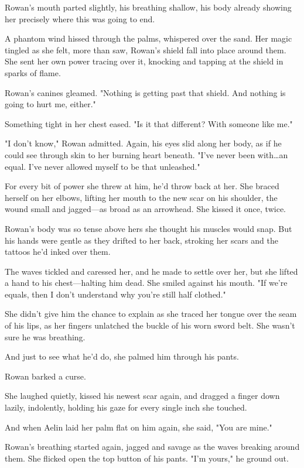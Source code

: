 Rowan's mouth parted slightly, his breathing shallow, his body already showing her precisely where this was going to end.

A phantom wind hissed through the palms, whispered over the sand.
Her magic tingled as she felt, more than saw, Rowan's shield fall into place around them.
She sent her own power tracing over it, knocking and tapping at the shield in sparks of flame.

Rowan's canines gleamed.
"Nothing is getting past that shield.
And nothing is going to hurt me, either."

Something tight in her chest eased.
"Is it that different?
With someone like me."

"I don't know," Rowan admitted.
Again, his eyes slid along her body, as if he could see through skin to her burning heart beneath.
"I've never been with\ldots an equal.
I've never allowed myself to be that unleashed."

For every bit of power she threw at him, he'd throw back at her.
She braced herself on her elbows, lifting her mouth to the new scar on his shoulder, the wound small and jagged---as broad as an arrowhead.
She kissed it once, twice.

Rowan's body was so tense above hers she thought his muscles would snap.
But his hands were gentle as they drifted to her back, stroking her scars and the tattoos he'd inked over them.

The waves tickled and caressed her, and he made to settle over her, but she lifted a hand to his chest---halting him dead.
She smiled against his mouth.
"If we're equals, then I don't understand why you're still half clothed."

She didn't give him the chance to explain as she traced her tongue over the seam of his lips, as her fingers unlatched the buckle of his worn sword belt.
She wasn't sure he was breathing.

And just to see what he'd do, she palmed him through his pants.

Rowan barked a curse.

She laughed quietly, kissed his newest scar again, and dragged a finger down lazily, indolently, holding his gaze for every single inch she touched.

And when Aelin laid her palm flat on him again, she said, "You are mine."

Rowan's breathing started again, jagged and savage as the waves breaking around them.
She flicked open the top button of his pants.
"I'm yours," he ground out.

